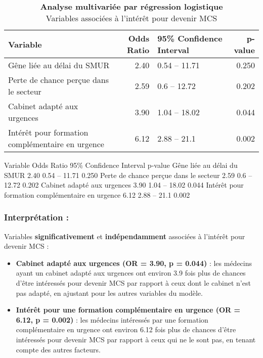 \documentclass[
]{article}
\begin{document}
\begin{table}[t]
\caption*{
{\large \textbf{Analyse multivariée par régression logistique}} \\ 
{\small Variables associées à l'intérêt pour devenir MCS}
} 
\fontsize{9.8pt}{11.7pt}\selectfont
\begin{tabular*}{\linewidth}{@{\extracolsep{\fill}}lrlr}
\toprule
Variable & Odds Ratio & 95\% Confidence Interval & p-value \\ 
\midrule\addlinespace[2.5pt]
Gêne liée au délai du SMUR & 2.40 & 0.54 – 11.71 & 0.250 \\ 
Perte de chance perçue dans le secteur & 2.59 & 0.6 – 12.72 & 0.202 \\ 
Cabinet adapté aux urgences & 3.90 & 1.04 – 18.02 & 0.044 \\ 
Intérêt pour formation complémentaire en urgence & 6.12 & 2.88 – 21.1 & 0.002 \\ 
\bottomrule
\end{tabular*}
\end{table}

Variable Odds Ratio 95\% Confidence Interval p-value Gêne liée au délai
du SMUR 2.40 0.54 -- 11.71 0.250 Perte de chance perçue dans le secteur
2.59 0.6 -- 12.72 0.202 Cabinet adapté aux urgences 3.90 1.04 -- 18.02
0.044 Intérêt pour formation complémentaire en urgence 6.12 2.88 -- 21.1
0.002

\subsubsection{Interprétation :}\label{interpruxe9tation}

Variables \textbf{significativement} et \textbf{indépendamment}
associées à l'intérêt pour devenir MCS :

\begin{itemize}
\item
  \textbf{Cabinet adapté aux urgences (OR = 3.90, p = 0.044)} : les
  médecins ayant un cabinet adapté aux urgences ont environ 3.9 fois
  plus de chances d'être intéressés pour devenir MCS par rapport à ceux
  dont le cabinet n'est pas adapté, en ajustant pour les autres
  variables du modèle.
\item
  \textbf{Intérêt pour une formation complémentaire en urgence (OR =
  6.12, p = 0.002)} : les médecins intéressés par une formation
  complémentaire en urgence ont environ 6.12 fois plus de chances d'être
  intéressés pour devenir MCS par rapport à ceux qui ne le sont pas, en
  tenant compte des autres facteurs.
\end{itemize}
\end{document}
